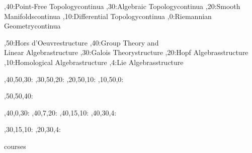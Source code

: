 \documentclass{article}
\begin{document}
	
	\begin{chart}%
		\begin{scope}[every rectangle node/.style={
				sharp corners,
				line width=0.6pt,
				fill=gray!15
			}]
			,40:{}{Point-Free Topology}{continua}
			,30:{}{Algebraic Topology}{continua}
			,20:{}{Smooth Manifolds}{continua}
			,10:{}{Differential Topology}{continua}		
			,0:{}{Riemannian Geometry}{continua}

			,50:{}{Hors d'Oeuvre}{structure}
			,40:{}{Group Theory and\\Linear Algebra}{structure}
			,30:{}{Galois Theory}{structure}		
			,20:{}{Hopf Algebras}{structure}
			,10:{}{Homological Algebra}{structure}
			,4:{}{Lie Algebras}{structure}
		\end{scope}
		
		,40,50,30:
		,30,50,20:
		,20,50,10:
		,10,50,0:
		
		,50,50,40:

		,40,0,30:
		,40,7,20:
		,40,15,10:
		,40,30,4:
		
		,30,15,10:
		,20,30,4:
		
		\begin{pgfonlayer}{courses}
		\end{pgfonlayer}
	\end{chart}
	
\end{document}
